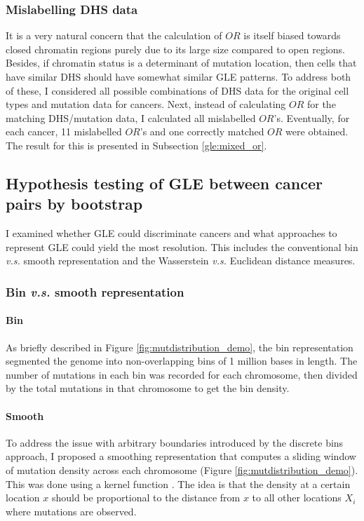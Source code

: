 \subsubsection{Mislabelling DHS data}
It is a very natural concern that the calculation of $OR$ is itself biased towards closed chromatin regions purely due to its large size compared to open regions. Besides, if chromatin status is a determinant of mutation location, then cells that have similar DHS should have somewhat similar GLE patterns. To address both of these, I considered all possible combinations of DHS data for the original cell types and mutation data for cancers. Next, instead of calculating $OR$ for the matching DHS/mutation data, I calculated all mislabelled $OR$'s. Eventually, for each cancer, 11 mislabelled $OR$'s and one correctly matched $OR$ were obtained. The result for this is presented in Subsection \ref{gle:mixed_or}.

\subsection{Hypothesis testing of GLE between cancer pairs by bootstrap}\label{methods:bootstrap}

I examined whether GLE could discriminate cancers and what approaches to represent GLE could yield the most resolution. This includes the conventional bin \textit{v.s.} smooth representation and the Wasserstein \textit{v.s.} Euclidean distance measures. 

\subsubsection{Bin \textit{v.s.} smooth representation}
\paragraph{Bin} As briefly described in Figure \ref{fig:mutdistribution_demo}, the bin representation segmented the genome into non-overlapping bins of 1 million bases in length. The number of mutations in each bin was recorded for each chromosome, then divided by the total mutations in that chromosome to get the bin density. 
\paragraph{Smooth} To address the issue with arbitrary boundaries introduced by the discrete bins approach, I proposed a smoothing representation that computes a sliding window of mutation density across each chromosome (Figure \ref{fig:mutdistribution_demo}). This was done using a kernel function \citep[equation \ref{eq:density};][]{Silverman1986DensityAnalysis}. The idea is that the density at a certain location $x$ should be proportional to the distance from $x$ to all other locations $X_i$ where mutations are observed. 

